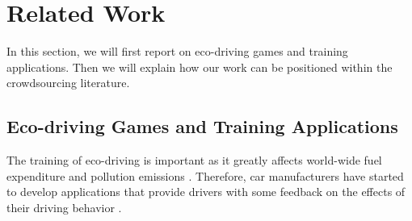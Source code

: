 \documentclass[preprint,authoryear,12pt]{elsarticle}
\newcommand{\question}[1] {} %
\newcommand{\commentShow}[1] {} %
\begin{document}

\section{Related Work}\label{sec:background}

In this section, we will first report on eco-driving games and training applications.
Then we will explain how our work can be positioned within the crowdsourcing literature.

\subsection{Eco-driving Games and Training Applications}
\label{subsec:eco-driving}

The training of eco-driving is important as it greatly affects world-wide fuel expenditure and pollution emissions \citep{barkenbus2010eco,shaheen2012ecodriving}. Therefore, car manufacturers have started to develop applications that provide drivers with some feedback on the effects of their driving behavior \citep{EcoTools,FiatEcoGame}.




\end{document}
